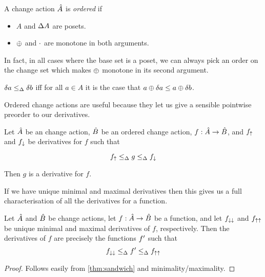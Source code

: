 \begin{defn}
  A change action $\hat{A}$ is \emph{ordered} if
  \begin{itemize}
    \item $A$ and $\Delta A$ are posets.
    \item $\oplus$ and $\cdot$ are monotone in both arguments.
  \end{itemize}
\end{defn}

In fact, in all cases where the base set is a poset, we can always pick an order on the change
set which makes $\oplus$ monotone in its second argument.

\begin{defn}
  $\delta a \leq_\Delta \delta b$ iff for all $a \in A$ it is the case that $a \oplus \delta a \leq a \oplus \delta b$.
\end{defn}

Ordered change actions are useful because they let us give a sensible pointwise preorder
to our derivatives.

\begin{thm}
  \label{thm:sandwich}
  Let $\hat{A}$ be an change action, $\hat{B}$ be an ordered change action,
  $f: \hat{A} \rightarrow \hat{B}$, and $f_\uparrow$ and $f_\downarrow$ be
  derivatives for $f$ such that

  \begin{displaymath}
    f_\uparrow \leq_\Delta g \leq_\Delta f_\downarrow
  \end{displaymath}

  Then $g$ is a derivative for $f$.
\end{thm}

If we have unique minimal and maximal derivatives then this gives us a full
characterisation of all the derivatives for a function.

\begin{thm}
\label{thm:derivativeCharacterization}
  Let $\hat{A}$ and $\hat{B}$ be change actions, let
  $f: \hat{A} \rightarrow \hat{B}$ be a function, and let $f_{\downarrow\downarrow}$ and
  $f_{\uparrow\uparrow}$ be unique minimal and maximal derivatives of $f$, respectively.
  Then the derivatives of $f$ are precisely
  the functions $f'$ such that
  \begin{displaymath}
    f_{\downarrow\downarrow} \leq_\Delta f' \leq_\Delta f_{\uparrow\uparrow}
  \end{displaymath}
\end{thm}
\ifproofs
\begin{proof}
  Follows easily from \cref{thm:sandwich} and minimality/maximality.
\end{proof}
\fi

